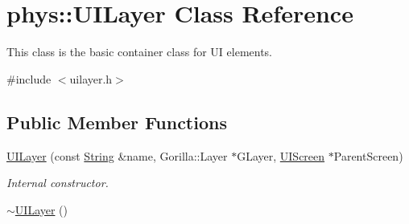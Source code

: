 \hypertarget{classphys_1_1UILayer}{
\section{phys::UILayer Class Reference}
\label{da/d48/classphys_1_1UILayer}
}


This class is the basic container class for UI elements.  




{\ttfamily \#include $<$uilayer.h$>$}

\subsection*{Public Member Functions}
\begin{DoxyCompactItemize}
\item 
\hyperlink{classphys_1_1UILayer_a2ba5ae1bd83313646e18f7082c586c1f}{UILayer} (const \hyperlink{namespacephys_aa03900411993de7fbfec4789bc1d392e}{String} \&name, Gorilla::Layer $\ast$GLayer, \hyperlink{classphys_1_1UIScreen}{UIScreen} $\ast$ParentScreen)
\begin{DoxyCompactList}\small\item\em Internal constructor. \item\end{DoxyCompactList}\item 
\hypertarget{classphys_1_1UILayer_ac09b13a0ebae1a2ed99f689c70ada5e5}{
\hyperlink{classphys_1_1UILayer_ac09b13a0ebae1a2ed99f689c70ada5e5}{$\sim$UILayer} ()}
\label{da/d48/classphys_1_1UILayer_ac09b13a0ebae1a2ed99f689c70ada5e5}


\end{DoxyCompactItemize}
